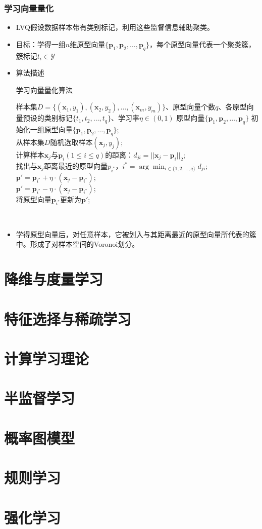 \documentclass{ctexart}
\begin{document}
					\subsubsection{学习向量量化}
						\begin{itemize}
							\item LVQ假设数据样本带有类别标记，利用这些监督信息辅助聚类。
							\item 目标：学得一组$n$维原型向量$\{\bm{p}_1,\bm{p}_2,\dots,\bm{p}_q\}$，每个原型向量代表一个聚类簇，簇标记$t_i\in\mathcal{Y}$
							\item 算法描述\begin{algorithm}
								\caption{学习向量量化算法}
								\begin{algorithmic}[1]
									\REQUIRE 样本集$D=\{(\bm{x}_1,y_1),(\bm{x}_2,y_2),\dots,(\bm{x}_m,y_m)\}$、原型向量个数$q$、各原型向量预设的类别标记$\{t_1,t_2,\dots,t_q\}$、学习率$\eta\in(0,1)$
									\ENSURE 原型向量$\{\bm{p}_1,\bm{p}_2,\dots,\bm{p}_q\}$
									\STATE 初始化一组原型向量$\{\bm{p}_1,\bm{p}_2,\dots,\bm{p}_q\}$; \\
									\REPEAT
										\STATE 从样本集$D$随机选取样本$(\bm{x}_j,y_j)$; \\
										\STATE 计算样本$\bm{x}_j$与$\bm{p}_i(1\le i\le q)$的距离：$d_{ji}=||\bm{x}_j-\bm{p}_i||_2$; \\
										\STATE 找出与$\bm{x}_j$距离最近的原型向量$p_{i^*}$，$i^*=\arg\min_{i\in\{1,2,\dots,q\}}d_{ji}$; \\
											\STATE $\bm{p}'=\bm{p}_{i^*}+\eta\cdot(\bm{x}_j-\bm{p}_{i^*})$; \\
										\ELSE
											\STATE $\bm{p}'=\bm{p}_{i^*}-\eta\cdot(\bm{x}_j-\bm{p}_{i^*})$; \\
										\ENDIF
										\STATE 将原型向量$\bm{p}_{i^*}$更新为$\bm{p}'$; \\
								\end{algorithmic} 
							\end{algorithm}
							\item 学得原型向量后，对任意样本，它被划入与其距离最近的原型向量所代表的簇中。形成了对样本空间的Voronoi划分。
						\end{itemize}
			\section{降维与度量学习}
			\section{特征选择与稀疏学习}
			\section{计算学习理论}
			\section{半监督学习}
			\section{概率图模型}
			\section{规则学习}
			\section{强化学习}
			
\end{document}
